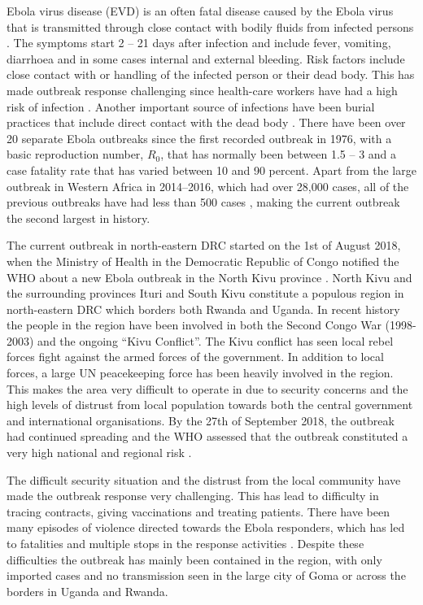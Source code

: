 \documentclass[12pt]{article}
\begin{document}
Ebola virus disease (EVD) is an often fatal disease caused by the Ebola virus that is transmitted through close contact with bodily fluids from infected persons \cite{worldhealthorganisationEbolaVirusDisease}. The symptoms start 2 -- 21 days after infection and include fever, vomiting, diarrhoea and in some cases internal and external bleeding.  Risk factors include close contact with or handling of the infected person or their dead body. This has made outbreak response challenging since health-care workers have had a high risk of infection \cite{brainardRiskFactorsTransmission2016}. Another important source of infections have been burial practices that include direct contact with the dead body \cite{brainardRiskFactorsTransmission2016}. There have been over 20 separate Ebola outbreaks since the first recorded outbreak in 1976, with a basic reproduction number, $R_0$, that has normally been between 1.5 -- 3 \cite{whoebolaresponseteamEbolaVirusDisease2014,legrandUnderstandingDynamicsEbola2007} and a case fatality rate that has varied between 10 and 90 percent. Apart from the large outbreak in Western Africa in 2014--2016, which had over 28,000 cases, all of the previous outbreaks have had less than 500 cases \cite{worldhealthorganisationEbolaVirusDisease}, making the current outbreak the second largest in history.

The current outbreak in north-eastern DRC started on the 1st of August 2018, when the Ministry of Health in the Democratic Republic of Congo notified the WHO about a new Ebola outbreak in the North Kivu province \cite{worldhealthorganizationEbolaOutbreakDRC2018a}. North Kivu and the surrounding provinces Ituri and South Kivu constitute a populous region in north-eastern DRC which borders both Rwanda and Uganda. In recent history the people in the region have been involved in both the Second Congo War (1998-2003) and the ongoing ``Kivu Conflict''. The Kivu conflict has seen local rebel forces fight against the armed forces of the government. In addition to local forces, a large UN peacekeeping force has been heavily involved in the region. This makes the area very difficult to operate in due to security concerns and the high levels of distrust from local population towards both the central government and international organisations. By the 27th of September 2018, the outbreak had continued spreading and the WHO assessed that the outbreak constituted a very high national and regional risk \cite{worldhealthorganizationEbolaOutbreakDRC2018b}.

The difficult security situation and the distrust from the local community have made the outbreak response very challenging. This has lead to difficulty in tracing contracts, giving vaccinations and treating patients. There have been many episodes of violence directed towards the Ebola responders, which has led to fatalities and multiple stops in the response activities \cite{worldhealthorganizationEbolaOutbreakDRC2018c,worldhealthorganizationEbolaOutbreakDRC2019a}. Despite these difficulties the outbreak has mainly been contained in the region, with only imported cases and no transmission seen in the large city of Goma or across the borders in Uganda and Rwanda. 
\end{document}
